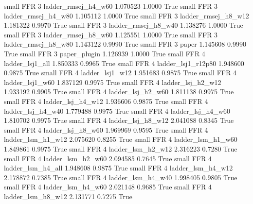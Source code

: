      small      FFR                 3      ladder_rmsej_h4_w60   1.070523      1.0000    True
     small      FFR                 3      ladder_rmsej_h4_w80   1.105112      1.0000    True
     small      FFR                 3      ladder_rmsej_h8_w12   1.181322      0.9970    True
     small      FFR                 3      ladder_rmsej_h8_w40   1.138276      1.0000    True
     small      FFR                 3      ladder_rmsej_h8_w60   1.125551      1.0000    True
     small      FFR                 3      ladder_rmsej_h8_w80   1.143122      0.9990    True
     small      FFR                 3                    paper   1.145608      0.9990    True
     small      FFR                 3             paper_plugin   1.126939      1.0000    True
     small      FFR                 4          ladder_lsj1_all   1.850333      0.9965    True
     small      FFR                 4       ladder_lsj1_r12p80   1.948600      0.9875    True
     small      FFR                 4          ladder_lsj1_w12   1.951683      0.9875    True
     small      FFR                 4          ladder_lsj1_w60   1.837129      0.9975    True
     small      FFR                 4        ladder_lsj_h2_w12   1.933192      0.9905    True
     small      FFR                 4        ladder_lsj_h2_w60   1.811138      0.9975    True
     small      FFR                 4        ladder_lsj_h4_w12   1.936606      0.9875    True
     small      FFR                 4        ladder_lsj_h4_w40   1.779488      0.9975    True
     small      FFR                 4        ladder_lsj_h4_w60   1.810702      0.9975    True
     small      FFR                 4        ladder_lsj_h8_w12   2.041088      0.8345    True
     small      FFR                 4        ladder_lsj_h8_w60   1.969969      0.9595    True
     small      FFR                 4        ladder_lsm_h1_w12   2.075620      0.8255    True
     small      FFR                 4        ladder_lsm_h1_w60   1.849861      0.9975    True
     small      FFR                 4        ladder_lsm_h2_w12   2.316223      0.7280    True
     small      FFR                 4        ladder_lsm_h2_w60   2.094585      0.7645    True
     small      FFR                 4        ladder_lsm_h4_all   1.948608      0.9875    True
     small      FFR                 4        ladder_lsm_h4_w12   2.178872      0.7385    True
     small      FFR                 4        ladder_lsm_h4_w40   1.998405      0.9805    True
     small      FFR                 4        ladder_lsm_h4_w60   2.021148      0.9685    True
     small      FFR                 4        ladder_lsm_h8_w12   2.131771      0.7275    True
